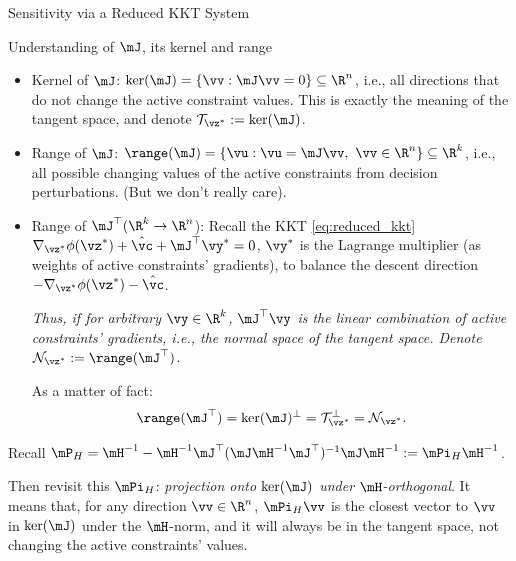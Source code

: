\documentclass[10pt,aspectratio=169,xcolor=dvipsnames]{beamer}
\begin{document}
\begin{frame}[allowframebreaks]{Sensitivity via a Reduced KKT System}
    \begin{block}{\small Understanding of $\mJ$, its kernel and range}
        \begin{itemize}
            \item Kernel of $\mJ$: $\ker(\mJ) = \{\vv : \mJ \vv = 0\} \subseteq \R^n$, i.e., all directions that do not change the active constraint values. This is exactly the meaning of the tangent space, and denote $\mathcal{T}_{\vz^*} := \ker(\mJ)$.
            \item Range of $\mJ$: $\range(\mJ) = \{\vu : \vu = \mJ \vv,~\vv \in \R^n\} \subseteq \R^k$, i.e., all possible changing values of the active constraints from decision perturbations. (But we don't really care).
            \item Range of $\mJ^\top (\R^k \to \R^n$): Recall the KKT \eqref{eq:reduced_kkt} $\nabla_{\vz^*} \phi(\vz^*) + \hat{\vc} + \mJ^\top \vy^* = 0$, $\vy^*$ is the Lagrange multiplier (as weights of active constraints' gradients), to balance the descent direction $-\nabla_{\vz^*} \phi(\vz^*) - \hat{\vc}$.

            \emph{Thus, if for arbitrary $\vy \in \R^k$, $\mJ^\top \vy$ is the linear combination of active constraints' gradients, i.e., the normal space of the tangent space. Denote $\mathcal{N}_{\vz^*} := \range(\mJ^\top)$.}

            As a matter of fact:
            \begin{equation}
                \range(\mJ^\top) = \ker(\mJ)^\perp = \mathcal{T}_{\vz^*}^\perp = \mathcal{N}_{\vz^*}.
            \end{equation}
        \end{itemize}
    \end{block}

    \break

    Recall $\mP_H = \mH^{-1} - \mH^{-1} \mJ^\top (\mJ \mH^{-1} \mJ^\top)^{-1} \mJ \mH^{-1} := \mPi_H \mH^{-1}$.

    \vspace{1em}

    Then revisit this $\mPi_H$: \emph{projection onto $\ker(\mJ)$ under $\mH$-orthogonal}. It means that, for any direction $\vv \in \R^n$, $\mPi_H \vv$ is the closest vector to $\vv$ in $\ker(\mJ)$ under the $\mH$-norm, and it will always be in the tangent space, not changing the active constraints' values.

    \break


\end{frame}
\end{document}
